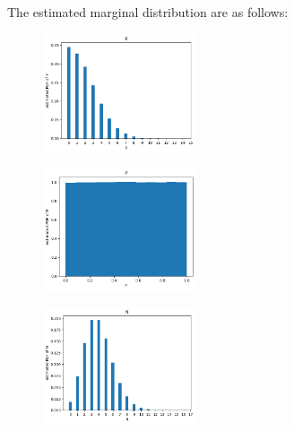 \begin{homeworkProblem}
\vspace{1cm}
The estimated marginal distribution are as follows:
\begin{figure}[h]
    \centering
    \includegraphics[width=0.4\textwidth]{./figure/p9/X.png}
\end{figure}
\begin{figure}[h]
    \centering
    \includegraphics[width=0.4\textwidth]{./figure/p9/P.png}
\end{figure}
\begin{figure}[h]
    \centering
    \includegraphics[width=0.4\textwidth]{./figure/p9/N.png}
\end{figure}

\end{homeworkProblem}

\newpage